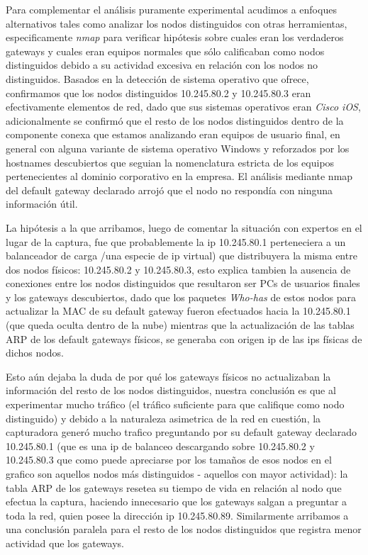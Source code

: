 Para complementar el análisis puramente experimental acudimos a enfoques alternativos tales como analizar los nodos distinguidos con otras herramientas, especificamente \textit{nmap} para verificar hipótesis sobre cuales eran los verdaderos gateways y cuales eran equipos normales que sólo calificaban como nodos distinguidos debido a su actividad excesiva en relación con los nodos no distinguidos. Basados en la detección de sistema operativo que ofrece, confirmamos que los nodos distinguidos 10.245.80.2 y 10.245.80.3 eran efectivamente elementos de red, dado que sus sistemas operativos eran \textit{Cisco iOS}, adicionalmente se confirmó que el resto de los nodos distinguidos dentro de la componente conexa que estamos analizando eran equipos de usuario final, en general con alguna variante de sistema operativo Windows y reforzados por los hostnames descubiertos que seguian la nomenclatura estricta de los equipos pertenecientes al dominio corporativo en la empresa. El análisis mediante nmap del default gateway declarado arrojó que el nodo no respondía con ninguna información útil.

La hipótesis a la que arribamos, luego de comentar la situación con expertos en el lugar de la captura, fue que probablemente la ip 10.245.80.1 perteneciera a un balanceador de carga /una especie de ip virtual) que distribuyera la misma entre dos nodos físicos: 10.245.80.2 y 10.245.80.3, esto explica tambien la ausencia de conexiones entre los nodos distinguidos que resultaron ser PCs de usuarios finales y los gateways descubiertos, dado que los paquetes \textit{Who-has} de estos nodos para actualizar la MAC de su default gateway fueron efectuados hacia la 10.245.80.1 (que queda oculta dentro de la nube) mientras que la actualización de las tablas ARP de los default gateways físicos, se generaba con origen ip de las ips físicas de dichos nodos.

Esto aún dejaba la duda de por qué los gateways físicos no actualizaban la información del resto de los nodos distinguidos, nuestra conclusión es que al experimentar mucho tráfico (el tráfico suficiente para que califique como nodo distinguido) y debido a la naturaleza asimetrica de la red en cuestión, la capturadora generó mucho trafico preguntando por su default gateway declarado 10.245.80.1 (que es una ip de balanceo descargando sobre 10.245.80.2 y 10.245.80.3  que como puede apreciarse por los tamaños de esos nodos en el grafico son aquellos nodos más distinguidos - aquellos con mayor actividad): la tabla ARP de los gateways resetea su tiempo de vida en relación al nodo que efectua la captura, haciendo innecesario que los gateways salgan a preguntar a toda la red, quien posee la dirección ip 10.245.80.89.
Similarmente arribamos a una conclusión paralela para el resto de los nodos distinguidos que registra menor actividad que los gateways.

